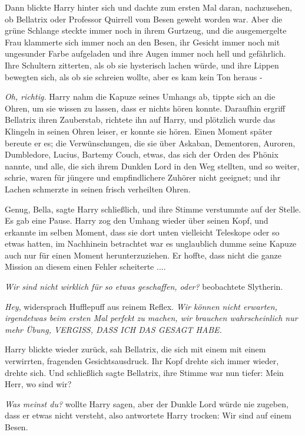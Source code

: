 Dann blickte Harry hinter sich und dachte zum ersten Mal daran, nachzusehen, ob
Bellatrix oder Professor Quirrell vom Besen geweht worden war. Aber die grüne
Schlange steckte immer noch in ihrem Gurtzeug, und die ausgemergelte Frau
klammerte sich immer noch an den Besen, ihr Gesicht immer noch mit ungesunder
Farbe aufgeladen und ihre Augen immer noch hell und gefährlich. Ihre Schultern
zitterten, als ob sie hysterisch lachen würde, und ihre Lippen bewegten sich,
als ob sie schreien wollte, aber es kam kein Ton heraus -

\emph{Oh, richtig.} Harry nahm die Kapuze seines Umhangs ab, tippte sich an die
Ohren, um sie wissen zu lassen, dass er nichts hören konnte. Daraufhin ergriff
Bellatrix ihren Zauberstab, richtete ihn auf Harry, und plötzlich wurde das
Klingeln in seinen Ohren leiser, er konnte sie hören. Einen Moment später
bereute er es; die Verwünschungen, die sie über Askaban, Dementoren, Auroren,
Dumbledore, Lucius, Bartemy Couch, etwas, das sich der Orden des Phönix nannte,
und alle, die sich ihrem Dunklen Lord in den Weg stellten, und so weiter,
schrie, waren für jüngere und empfindlichere Zuhörer nicht geeignet; und ihr
Lachen schmerzte in seinen frisch verheilten Ohren.

\glqq{}Genug, Bella\grqq{}, sagte Harry schließlich, und ihre Stimme verstummte
auf der Stelle. Es gab eine Pause. Harry zog den Umhang wieder über seinen Kopf,
und erkannte im selben Moment, dass sie dort unten vielleicht Teleskope oder so
etwas hatten, im Nachhinein betrachtet war es unglaublich dumme seine Kapuze
auch nur für einen Moment herunterzuziehen. Er hoffte, dass nicht die ganze
Mission an diesem einen Fehler scheiterte ....

\emph{Wir sind nicht wirklich für so etwas geschaffen, oder?} beobachtete
Slytherin.

\emph{Hey}, widersprach Hufflepuff aus reinem Reflex. \emph{Wir können nicht
erwarten, irgendetwas beim ersten Mal perfekt zu machen, wir brauchen
wahrscheinlich nur mehr Übung, VERGISS, DASS ICH DAS GESAGT HABE.}

Harry blickte wieder zurück, sah Bellatrix, die sich mit einem mit einem
verwirrten, fragenden Gesichtsausdruck. Ihr Kopf drehte sich immer wieder,
drehte sich. Und schließlich sagte Bellatrix, ihre Stimme war nun tiefer: \glqq{}
Mein Herr, wo sind wir?\grqq{}

\emph{Was meinst du?} wollte Harry sagen, aber der Dunkle Lord würde nie
zugeben, dass er etwas nicht versteht, also antwortete Harry trocken: \glqq{}Wir
sind auf einem Besen.\grqq{}

